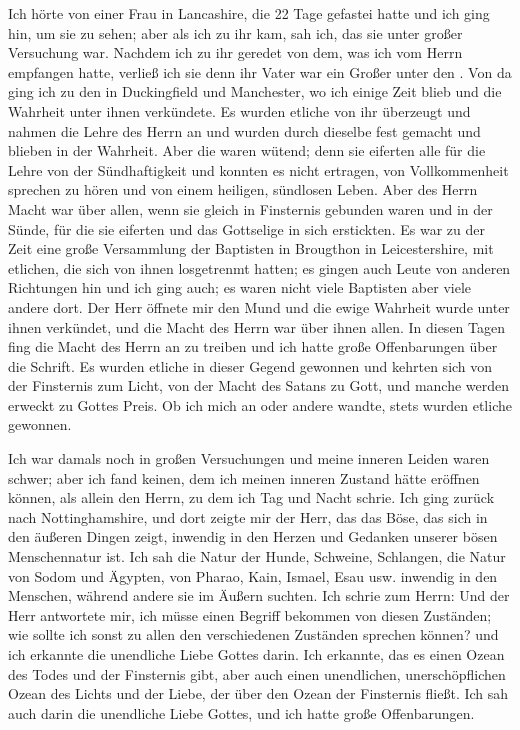 Ich hörte von einer Frau in Lancashire, die 22 Tage gefastei 
hatte und ich ging hin, um sie zu sehen; aber als ich zu
ihr kam, sah ich, das sie unter großer Versuchung war. 
Nachdem ich zu ihr geredet von dem, was ich vom Herrn empfangen
hatte, verließ ich sie denn ihr Vater war ein Großer unter den
. Von da ging ich zu den  in Duckingfield
und Manchester, wo ich einige Zeit blieb und die Wahrheit unter
ihnen verkündete. Es wurden etliche von ihr überzeugt und nahmen
die Lehre des Herrn an und wurden durch dieselbe fest gemacht und
blieben in der Wahrheit. Aber die  waren wütend;
denn sie eiferten alle für die Lehre von der Sündhaftigkeit und
konnten es nicht ertragen, von Vollkommenheit sprechen zu hören
und von einem heiligen, sündlosen Leben. Aber des Herrn Macht
war über allen, wenn sie gleich in Finsternis gebunden waren
und in der Sünde, für die sie eiferten und das Gottselige in sich
erstickten. Es war zu der Zeit eine große Versammlung der
Baptisten in Brougthon in Leicestershire, mit etlichen, die sich
von ihnen losgetrenmt hatten; es gingen auch Leute von anderen
Richtungen hin und ich ging auch; es waren nicht viele Baptisten
aber viele andere dort. Der Herr öffnete mir den Mund und
die ewige Wahrheit wurde unter ihnen verkündet, und die Macht
des Herrn war über ihnen allen. In diesen Tagen fing die Macht
des Herrn an zu treiben und ich hatte große Offenbarungen über die
Schrift. Es wurden etliche in dieser Gegend gewonnen und kehrten
sich von der Finsternis zum Licht, von der Macht des Satans zu
Gott, und manche werden erweckt zu Gottes Preis. Ob ich mich an
 oder andere wandte, stets wurden etliche gewonnen.

Ich war damals noch in großen Versuchungen und meine
inneren Leiden waren schwer; aber ich fand keinen, dem ich meinen
inneren Zustand hätte eröffnen können, als allein den Herrn, zu
dem ich Tag und Nacht schrie. Ich ging zurück nach 
Nottinghamshire, und dort zeigte mir 
der Herr, das das Böse, das sich
in den äußeren Dingen zeigt, inwendig in den Herzen und 
Gedanken unserer bösen Menschennatur ist. Ich sah die Natur der
Hunde, Schweine, Schlangen, die Natur von Sodom und Ägypten,
von Pharao, Kain, Ismael, Esau usw. inwendig in den Menschen,
während andere sie im Äußern suchten. Ich schrie zum Herrn:
 Und der Herr antwortete mir, ich
müsse einen Begriff bekommen von diesen Zuständen; wie sollte
ich sonst zu allen den verschiedenen Zuständen sprechen können?
und ich erkannte die unendliche Liebe Gottes darin. Ich erkannte,
das es einen Ozean des Todes 
und der Finsternis gibt, aber
auch einen unendlichen, unerschöpflichen Ozean des 
Lichts und
der Liebe, der über den Ozean der Finsternis fließt. Ich sah
auch darin die unendliche Liebe Gottes, und ich hatte große
Offenbarungen.

